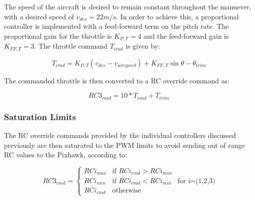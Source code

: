\documentclass{aiaa}
\begin{document}
The speed of the aircraft is desired to remain constant throughout the manuever, with a desired speed of $v_{des} = 22 m/s$. In order to achieve this, a proportional controller is implemented with a feed-forward term on the pitch rate. The proportional gain for the throttle is $K_{P,T} = 4$ and the feed-forward gain is $K_{FF,T} = 3$. The throttle command $T_{cmd}$ is given by:

\begin{equation}
T_{cmd} = K_{P,T}(v_{des} - v_{airspeed}) + K_{FF,T}\sin{\theta - \theta_{trim}}
\end{equation}

The commanded throttle is then converted to a RC override command as:

\begin{equation}
RC3_{cmd} = 10*T_{cmd} + T_{trim}
\end{equation}




\subsubsection{Saturation Limits}


The RC override commands provided by the individual controllers discussed previously are then saturated to the PWM limits to avoid sending out of range RC values to the Pixhawk, according to:

\begin{equation}
	RC3_{cmd} = 
	\begin{cases}
		RCi_{max} & \text{if } RCi_{cmd} > RCi_{max}\\
        RCi_{min} & \text{if } RCi_{cmd} < RCi_{min}\\
        RCi_{cmd} & \text{otherwise}
     \end{cases}
     \text{      for i=(1,2,3)}
\end{equation}
\end{document}
